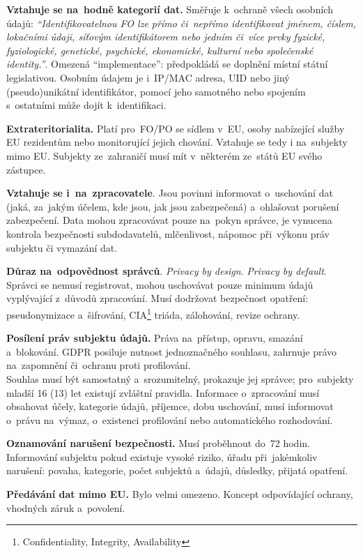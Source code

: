 \textbf{Vztahuje se na~hodně kategorií dat.} Směřuje k~ochraně všech osobních údajů: \emph{\enquote{Identifikovatelnou FO lze přímo či~nepřímo identifikovat jménem, číslem, lokačními údaji, síťovým identifikátorem nebo jedním či~více prvky fyzické, fyziologické, genetické, psychické, ekonomické, kulturní nebo společenské identity.}}. Omezená \enquote{implementace}: předpokládá se doplnění místní státní legislativou. Osobním údajem je i~IP/MAC adresa, UID nebo jiný (pseudo)unikátní identifikátor, pomocí jeho samotného nebo spojením s~ostatními může dojít k~identifikaci.

\textbf{Extrateritorialita.} Platí pro~FO/PO se sídlem v~EU, osoby nabízející služby EU rezidentům nebo monitorující jejich chování. Vztahuje se tedy i na~subjekty mimo EU. Subjekty ze~zahraničí musí mít v~některém ze~států EU svého zástupce.

\textbf{Vztahuje se i~na~zpracovatele}. Jsou povinni informovat o~uschování dat (jaká, za~jakým účelem, kde jsou, jak jsou zabezpečená) a~ohlašovat porušení zabezpečení. Data mohou zpracovávat pouze na~pokyn správce, je vynucena kontrola bezpečnosti subdodavatelů, mlčenlivost, nápomoc při~výkonu práv subjektu či vymazání dat.

\textbf{Důraz na~odpovědnost správců}. \emph{Privacy by design}. \emph{Privacy by default}. Správci se nemusí registrovat, mohou uschovávat pouze minimum údajů vyplývající z~důvodů zpracování. Musí dodržovat bezpečnost opatření: pseudonymizace a~šifrování, CIA\footnote{Confidentiality, Integrity, Availability} triáda, zálohování, revize ochrany.

\textbf{Posílení práv subjektu údajů.} Práva na~přístup, opravu, smazání a~blokování. GDPR posiluje nutnost jednoznačného souhlasu, zahrnuje právo na~zapomnění či~ochranu proti profilování. \\
Souhlas musí být samostatný a~srozumitelný, prokazuje jej správce; pro~subjekty mladší 16 (13) let existují zvláštní pravidla. Informace o~zpracování musí obsahovat účely, kategorie údajů, příjemce, dobu uschování, musí informovat o~právu na~výmaz, o~existenci profilování nebo automatického rozhodování.

\textbf{Oznamování narušení bezpečnosti.} Musí proběhnout do~72 hodin. Informování subjektu pokud existuje vysoké riziko, úřadu při~jakémkoliv narušení: povaha, kategorie, počet subjektů a~údajů, důsledky, přijatá opatření.

\textbf{Předávání dat mimo EU.} Bylo velmi omezeno. Koncept odpovídající ochrany, vhodných záruk a~povolení.

